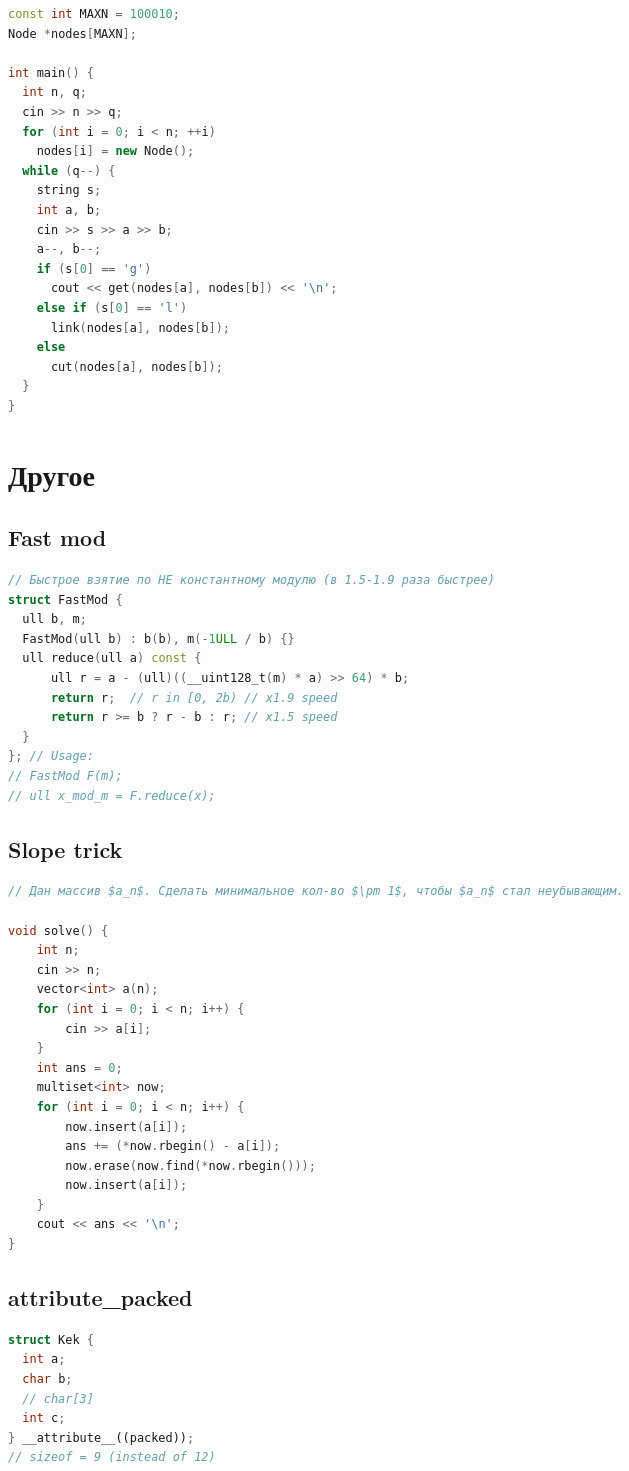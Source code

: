 \documentclass[9pt,a4paper,landscape,twosided]{extarticle}
\begin{document}
\begin{multicols*}{3}
\begin{lstlisting}[language=C++]
const int MAXN = 100010;
Node *nodes[MAXN];

int main() {
  int n, q;
  cin >> n >> q;
  for (int i = 0; i < n; ++i)
    nodes[i] = new Node();
  while (q--) {
    string s;
    int a, b;
    cin >> s >> a >> b;
    a--, b--;
    if (s[0] == 'g')
      cout << get(nodes[a], nodes[b]) << '\n';
    else if (s[0] == 'l')
      link(nodes[a], nodes[b]);
    else
      cut(nodes[a], nodes[b]);
  }
}

\end{lstlisting}

\section{Другое}

\subsection{Fast mod}
\begin{lstlisting}[language=C++]
// Быстрое взятие по НЕ константному модулю (в 1.5-1.9 раза быстрее)
struct FastMod {
  ull b, m;
  FastMod(ull b) : b(b), m(-1ULL / b) {}
  ull reduce(ull a) const {
      ull r = a - (ull)((__uint128_t(m) * a) >> 64) * b;
      return r;  // r in [0, 2b) // x1.9 speed
      return r >= b ? r - b : r; // x1.5 speed
  }
}; // Usage:
// FastMod F(m);
// ull x_mod_m = F.reduce(x);
\end{lstlisting}

\subsection{Slope trick}
\begin{lstlisting}[language=C++]
// Дан массив $a_n$. Сделать минимальное кол-во $\pm 1$, чтобы $a_n$ стал неубывающим.

void solve() {
    int n;
    cin >> n;
    vector<int> a(n);
    for (int i = 0; i < n; i++) {
        cin >> a[i];
    }
    int ans = 0;
    multiset<int> now;
    for (int i = 0; i < n; i++) {
        now.insert(a[i]);
        ans += (*now.rbegin() - a[i]);
        now.erase(now.find(*now.rbegin()));
        now.insert(a[i]);
    }
    cout << ans << '\n';
}
\end{lstlisting}

\subsection{attribute\_packed}
\begin{lstlisting}[language=C++]
struct Kek {
  int a;
  char b;
  // char[3]
  int c;
} __attribute__((packed));
// sizeof = 9 (instead of 12)
\end{lstlisting}


\end{multicols*}
\end{document}
